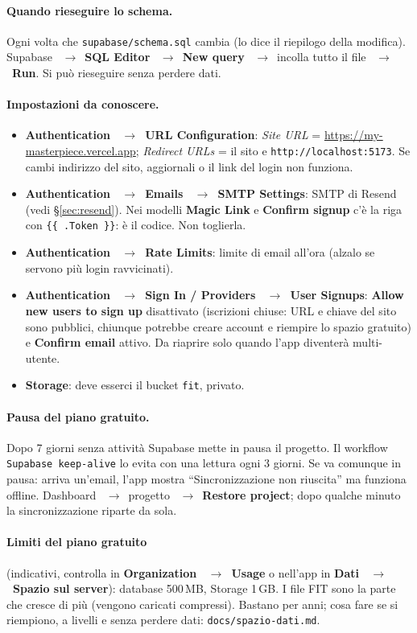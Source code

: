 \documentclass[11pt,a4paper]{article}
\newcommand{\ra}{\unskip\nobreak\ $\rightarrow$\ \ignorespaces}            %
\newcommand{\bt}[1]{\textbf{#1}}               %
\newcommand{\code}[1]{\texttt{#1}}             %
\newcommand{\sezione}[1]{\S\ref{#1}}           %
\newcommand{\sito}{https://my-masterpiece.vercel.app}
\begin{document}
\paragraph{Quando rieseguire lo schema.} Ogni volta che \code{supabase/schema.sql} cambia (lo dice il
riepilogo della modifica). Supabase \ra \bt{SQL Editor} \ra \bt{New query} \ra incolla tutto il file
\ra \bt{Run}. Si può rieseguire senza perdere dati.

\paragraph{Impostazioni da conoscere.}
\begin{itemize}
  \item \bt{Authentication \ra URL Configuration}: \emph{Site URL} = \url{\sito};
    \emph{Redirect URLs} = il sito e \code{http://localhost:5173}. Se cambi indirizzo del sito,
    aggiornali o il link del login non funziona.
  \item \bt{Authentication \ra Emails \ra SMTP Settings}: SMTP di Resend (vedi \sezione{sec:resend}).
    Nei modelli \bt{Magic Link} e \bt{Confirm signup} c'è la riga con \code{\{\{ .Token \}\}}:
    è il codice. Non toglierla.
  \item \bt{Authentication \ra Rate Limits}: limite di email all'ora (alzalo se servono più login ravvicinati).
  \item \bt{Authentication \ra Sign In / Providers \ra User Signups}: \bt{Allow new users to sign up}
    disattivato (iscrizioni chiuse: URL e chiave del sito sono pubblici, chiunque potrebbe creare
    account e riempire lo spazio gratuito) e \bt{Confirm email} attivo. Da riaprire solo quando
    l'app diventerà multi-utente.
  \item \bt{Storage}: deve esserci il bucket \code{fit}, privato.
\end{itemize}

\paragraph{Pausa del piano gratuito.} Dopo 7 giorni senza attività Supabase mette in pausa il
progetto. Il workflow \code{Supabase keep-alive} lo evita con una lettura ogni 3 giorni. Se va
comunque in pausa: arriva un'email, l'app mostra ``Sincronizzazione non riuscita'' ma funziona
offline. Dashboard \ra progetto \ra \bt{Restore project}; dopo qualche minuto la sincronizzazione
riparte da sola.

\paragraph{Limiti del piano gratuito} (indicativi, controlla in \bt{Organization \ra Usage} o
nell'app in \bt{Dati \ra Spazio sul server}): database 500\,MB, Storage 1\,GB. I file FIT sono la
parte che cresce di più (vengono caricati compressi). Bastano per anni; cosa fare se si riempiono,
a livelli e senza perdere dati: \code{docs/spazio-dati.md}.
\end{document}
